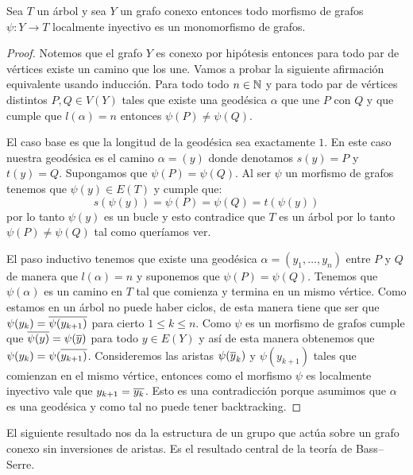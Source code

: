 \documentclass[tesis.tex]{subfiles}
\begin{document}
\begin{prop}\label{prop_loc_iny}
	Sea $T$ un árbol y sea $Y$ un grafo conexo entonces todo morfismo de grafos $\psi:Y \to T$ localmente inyectivo es un monomorfismo de grafos.    
\end{prop}
\begin{proof}
	Notemos que el grafo $Y$ es conexo por hipótesis entonces para todo par de vértices existe un camino que los une.
	Vamos a probar la siguiente afirmación equivalente usando inducción. 
	Para todo todo $n \in \mathbb{N}$ y para todo par de vértices distintos $P,Q \in V(Y)$  tales que existe una geodésica $\alpha$ que une $P$ con $Q$ y que cumple que $l(\alpha) = n$ entonces  $\psi(P) \neq \psi(Q)$.	
		
	
	El caso base es que la longitud de la geodésica sea exactamente $1$.
	En este caso nuestra geodésica es el camino $\alpha = (y)$ donde denotamos $s(y)= P$ y $t(y) = Q$.
	Supongamos que $\psi(P) = \psi(Q)$. 
	Al ser $\psi$ un morfismo de grafos tenemos que $\psi(y) \in E(T)$ y cumple que: 
	\begin{equation*}
		s(\psi(y)) = \psi(P) = \psi(Q) = t(\psi(y))
	\end{equation*}
	por lo tanto $\psi(y)$ es un bucle y esto contradice que $T$ es un árbol por lo tanto $\psi(P) \neq \psi(Q)$ tal como queríamos ver.
	
	
	El paso inductivo tenemos que existe una geodésica $\alpha= (y_1, \dots, y_n)$ entre $P$ y $Q$ de manera que $l(\alpha) = n$ y suponemos que $\psi(P) = \psi(Q)$.
	Tenemos que $\psi(\alpha)$ es un camino en $T$ tal que comienza y termina en un mismo vértice.
	Como estamos en un árbol no puede haber ciclos, de esta manera tiene que ser que $\psi(y_k) = \overline{\psi (y_{k+1})}$ para cierto $1 \le k \le n$.
	Como $\psi$ es un morfismo de grafos cumple que $\overline {\psi(y)} = \psi(\overline y)$ para todo $y \in E(Y)$ y así de esta manera obtenemos que $\psi(y_k) =  \psi(\overline{y_{k+1})}$.
	Consideremos las aristas $\psi(\overline y_{k})$ y $\psi(y_{k+1})$ tales que comienzan en el mismo vértice, entonces como el morfismo $\psi$ es localmente inyectivo vale que $y_{k+1} = \overline{y_k}$. 
	Esto es una contradicción porque asumimos que $\alpha$ es una geodésica y como tal no puede tener backtracking.    
	
\end{proof}

El siguiente resultado nos da la estructura de un grupo que actúa sobre un grafo conexo sin inversiones de aristas. 
Es el resultado central de la teoría de Bass--Serre.
\end{document}
